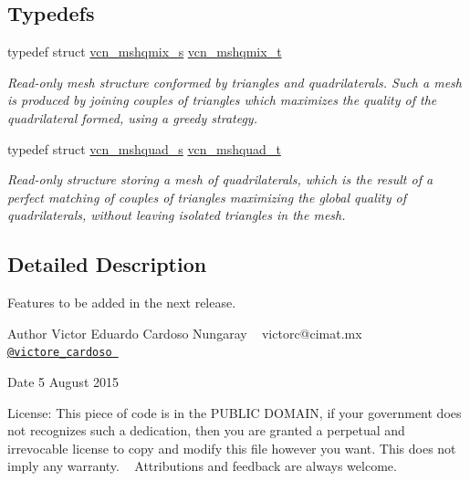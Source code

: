 \subsection*{Typedefs}
\begin{DoxyCompactItemize}
\item 
\hypertarget{geometric__bot-coming__soon_8h_a6afc4193e3c1f85a155299aaafc942e7}{typedef struct \hyperlink{structvcn__mshqmix__s}{vcn\+\_\+mshqmix\+\_\+s} \hyperlink{geometric__bot-coming__soon_8h_a6afc4193e3c1f85a155299aaafc942e7}{vcn\+\_\+mshqmix\+\_\+t}}\label{geometric__bot-coming__soon_8h_a6afc4193e3c1f85a155299aaafc942e7}

\begin{DoxyCompactList}\small\item\em Read-\/only mesh structure conformed by triangles and quadrilaterals. Such a mesh is produced by joining couples of triangles which maximizes the quality of the quadrilateral formed, using a greedy strategy. \end{DoxyCompactList}\item 
\hypertarget{geometric__bot-coming__soon_8h_ad8d160c4087aa79eaa0a4cd72fba2b67}{typedef struct \hyperlink{structvcn__mshquad__s}{vcn\+\_\+mshquad\+\_\+s} \hyperlink{geometric__bot-coming__soon_8h_ad8d160c4087aa79eaa0a4cd72fba2b67}{vcn\+\_\+mshquad\+\_\+t}}\label{geometric__bot-coming__soon_8h_ad8d160c4087aa79eaa0a4cd72fba2b67}

\begin{DoxyCompactList}\small\item\em Read-\/only structure storing a mesh of quadrilaterals, which is the result of a perfect matching of couples of triangles maximizing the global quality of quadrilaterals, without leaving isolated triangles in the mesh. \end{DoxyCompactList}\end{DoxyCompactItemize}


\subsection{Detailed Description}
Features to be added in the next release. 

\begin{DoxyAuthor}{Author}
Victor Eduardo Cardoso Nungaray ~\newline
 victorc@cimat.\+mx ~\newline
 \href{https://twitter.com/victore_cardoso}{\tt @victore\+\_\+cardoso } 
\end{DoxyAuthor}
\begin{DoxyDate}{Date}
5 August 2015
\end{DoxyDate}
\begin{DoxyParagraph}{License\+:}
This piece of code is in the P\+U\+B\+L\+I\+C D\+O\+M\+A\+I\+N, if your government does not recognizes such a dedication, then you are granted a perpetual and irrevocable license to copy and modify this file however you want. This does not imply any warranty. ~\newline
 Attributions and feedback are always welcome. 
\end{DoxyParagraph}
